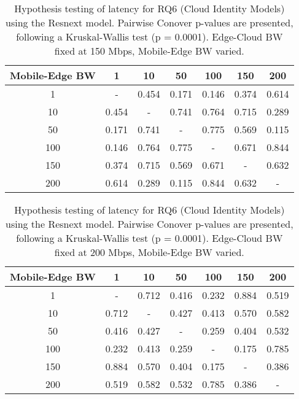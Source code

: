 \begin{table}[H]
\caption{Hypothesis testing of latency for RQ6 (Cloud Identity Models) using the Resnext model. Pairwise Conover p-values are presented, following a Kruskal-Wallis test (p = 0.0001). Edge-Cloud BW fixed at 150 Mbps, Mobile-Edge BW varied.}
\centering
\begin{tabular}{c|cccccc}
Mobile-Edge BW & 1 & 10 & 50 & 100 & 150 & 200 \\
\hline
1 & - & 0.454 & 0.171 & 0.146 & 0.374 & 0.614 \\
10 & 0.454 & - & 0.741 & 0.764 & 0.715 & 0.289 \\
50 & 0.171 & 0.741 & - & 0.775 & 0.569 & 0.115 \\
100 & 0.146 & 0.764 & 0.775 & - & 0.671 & 0.844 \\
150 & 0.374 & 0.715 & 0.569 & 0.671 & - & 0.632 \\
200 & 0.614 & 0.289 & 0.115 & 0.844 & 0.632 & - \\
\end{tabular}
\end{table}

\begin{table}[H]
\caption{Hypothesis testing of latency for RQ6 (Cloud Identity Models) using the Resnext model. Pairwise Conover p-values are presented, following a Kruskal-Wallis test (p = 0.0001). Edge-Cloud BW fixed at 200 Mbps, Mobile-Edge BW varied.}
\centering
\begin{tabular}{c|cccccc}
Mobile-Edge BW & 1 & 10 & 50 & 100 & 150 & 200 \\
\hline
1 & - & 0.712 & 0.416 & 0.232 & 0.884 & 0.519 \\
10 & 0.712 & - & 0.427 & 0.413 & 0.570 & 0.582 \\
50 & 0.416 & 0.427 & - & 0.259 & 0.404 & 0.532 \\
100 & 0.232 & 0.413 & 0.259 & - & 0.175 & 0.785 \\
150 & 0.884 & 0.570 & 0.404 & 0.175 & - & 0.386 \\
200 & 0.519 & 0.582 & 0.532 & 0.785 & 0.386 & - \\
\end{tabular}
\end{table}

